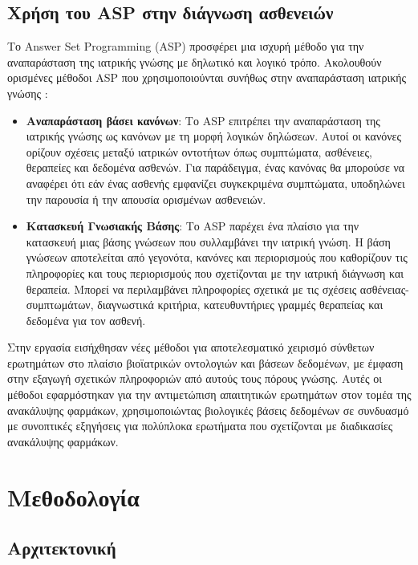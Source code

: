\documentclass[10pt,leqno]{amsart}
\begin{document}
\subsection{Χρήση του ASP στην διάγνωση ασθενειών}
Το Answer Set Programming (ASP) προσφέρει μια ισχυρή μέθοδο για την αναπαράσταση της ιατρικής γνώσης με δηλωτικό και λογικό τρόπο. Ακολουθούν ορισμένες μέθοδοι ASP που χρησιμοποιούνται συνήθως στην αναπαράσταση ιατρικής γνώσης \cite{Vinarti2019}:

\begin{itemize}
    \item \textbf{Αναπαράσταση βάσει κανόνων}: Το ASP επιτρέπει την αναπαράσταση της ιατρικής γνώσης ως κανόνων με τη μορφή λογικών δηλώσεων. Αυτοί οι κανόνες ορίζουν σχέσεις μεταξύ ιατρικών οντοτήτων όπως συμπτώματα, ασθένειες, θεραπείες και δεδομένα ασθενών. Για παράδειγμα, ένας κανόνας θα μπορούσε να αναφέρει ότι εάν ένας ασθενής εμφανίζει συγκεκριμένα συμπτώματα, υποδηλώνει την παρουσία ή την απουσία ορισμένων ασθενειών. 

    \item \textbf{Κατασκευή Γνωσιακής Βάσης}: Το ASP παρέχει ένα πλαίσιο για την κατασκευή μιας βάσης γνώσεων που συλλαμβάνει την ιατρική γνώση. Η βάση γνώσεων αποτελείται από γεγονότα, κανόνες και περιορισμούς που καθορίζουν τις πληροφορίες και τους περιορισμούς που σχετίζονται με την ιατρική διάγνωση και θεραπεία. Μπορεί να περιλαμβάνει πληροφορίες σχετικά με τις σχέσεις ασθένειας-συμπτωμάτων, διαγνωστικά κριτήρια, κατευθυντήριες γραμμές θεραπείας και δεδομένα για τον ασθενή.

    
\end{itemize}

Στην εργασία \cite{Erdem2011} εισήχθησαν νέες μέθοδοι για αποτελεσματικό χειρισμό σύνθετων ερωτημάτων στο πλαίσιο βιοϊατρικών οντολογιών και βάσεων δεδομένων, με έμφαση στην εξαγωγή σχετικών πληροφοριών από αυτούς τους πόρους γνώσης. Aυτές οι μέθοδοι εφαρμόστηκαν για την αντιμετώπιση απαιτητικών ερωτημάτων στον τομέα της ανακάλυψης φαρμάκων, χρησιμοποιώντας βιολογικές βάσεις δεδομένων σε συνδυασμό με συνοπτικές εξηγήσεις για πολύπλοκα ερωτήματα που σχετίζονται με διαδικασίες ανακάλυψης φαρμάκων.


\section{Μεθοδολογία}

\subsection{Αρχιτεκτονική}
\end{document}
